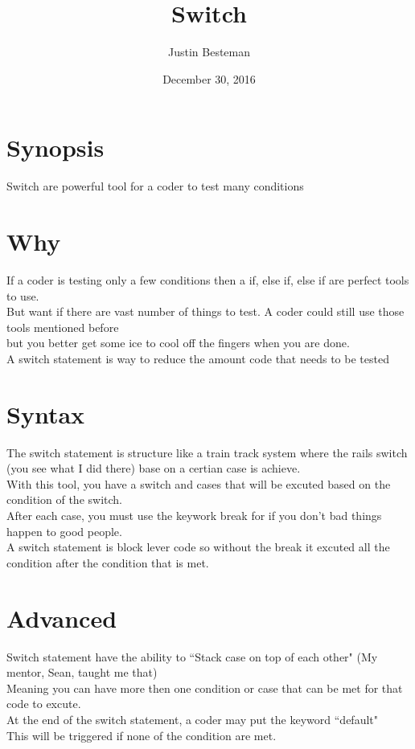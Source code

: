 \documentclass[12pt, letterpaper]{article}
\title{Switch}
\author{Justin Besteman}
\date{December 30, 2016}
\begin{document}
\maketitle


\section*{Synopsis}

Switch are powerful tool for a coder to test many conditions

\section*{Why}

If a coder is testing only a few conditions then a if, else if, else if are perfect tools to use. \\
But want if there are vast number of things to test. A coder could still use those tools mentioned before \\
but you better get some ice to cool off the fingers when you are done.\\
A switch statement is way to reduce the amount code that needs to be tested

\section*{Syntax}

The switch statement is structure like a train track system where the rails switch (you see what I did there) base on a certian case is achieve. \\
With this tool, you have a switch and cases that will be excuted based on the condition of the switch. \\
After each case, you must use the keywork break for if you don't bad things happen to good people.\\
A switch statement is block lever code so without the break it excuted all the condition after the condition that is met.

\section*{Advanced}

Switch statement have the ability to ``Stack case on top of each other" (My mentor, Sean, taught me that) \\
Meaning you can have more then one condition or case that can be met for that code to excute. \\
At the end of the switch statement, a coder may put the keyword ``default" \\
This will be triggered if none of the condition are met. 
\end{document}
